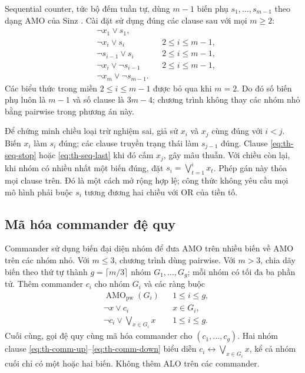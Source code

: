 Sequential counter, tức bộ đếm tuần tự, dùng $m-1$ biến phụ
$s_1,\ldots,s_{m-1}$ theo dạng AMO của Sinz \cite{sinz}. Cài đặt sử dụng
đúng các clause sau với mọi $m\geq2$:
\begin{align}
 &\neg x_1\lor s_1,\label{eq:th-seq-first}\\
 &\neg x_i\lor s_i &&2\leq i\leq m-1,\label{eq:th-seq-set}\\
 &\neg s_{i-1}\lor s_i &&2\leq i\leq m-1,\label{eq:th-seq-prop}\\
 &\neg x_i\lor\neg s_{i-1} &&2\leq i\leq m-1,\label{eq:th-seq-stop}\\
 &\neg x_m\lor\neg s_{m-1}.\label{eq:th-seq-last}
\end{align}
Các biểu thức trong miền $2\leq i\leq m-1$ được bỏ qua khi $m=2$.
Do đó số biến phụ luôn là $m-1$ và số clause là $3m-4$;
chương trình không thay các nhóm nhỏ bằng pairwise trong phương án này.

Để chứng minh chiều loại trừ nghiệm sai, giả sử $x_i$ và $x_j$ cùng
đúng với $i<j$. Biến $x_i$ làm $s_i$ đúng; các clause truyền trạng thái
làm $s_{j-1}$ đúng. Clause \eqref{eq:th-seq-stop} hoặc
\eqref{eq:th-seq-last} khi đó cấm $x_j$, gây mâu thuẫn. Với chiều còn
lại, khi nhóm có nhiều nhất một biến đúng, đặt
$s_i=\bigvee_{t=1}^{i}x_t$. Phép gán này thỏa mọi clause trên.
Đó là một cách mở rộng hợp lệ; công thức không yêu cầu mọi mô hình
phải buộc $s_i$ tương đương hai chiều với OR của tiền tố.

\subsection{Mã hóa commander đệ quy}

Commander sử dụng biến đại diện nhóm để đưa AMO trên nhiều biến về AMO
trên các nhóm nhỏ. Với $m\leq3$, chương trình dùng pairwise. Với $m>3$,
chia dãy biến theo thứ tự thành $g=\lceil m/3\rceil$ nhóm $G_1,\ldots,G_g$;
mỗi nhóm có tối đa ba phần tử. Thêm commander $c_i$ cho nhóm $G_i$ và
các ràng buộc
\begin{align}
 &\operatorname{AMO}_{\mathrm{pw}}(G_i) &&1\leq i\leq g,\\
 &\neg x\lor c_i &&x\in G_i,\label{eq:th-comm-up}\\
 &\neg c_i\lor\bigvee_{x\in G_i}x &&1\leq i\leq g.
 \label{eq:th-comm-down}
\end{align}
Cuối cùng, gọi đệ quy cùng mã hóa commander cho $(c_1,\ldots,c_g)$.
Hai nhóm clause \eqref{eq:th-comm-up}--\eqref{eq:th-comm-down} biểu
diễn $c_i\leftrightarrow\bigvee_{x\in G_i}x$, kể cả nhóm cuối chỉ có
một hoặc hai biến. Không thêm ALO trên các commander.

